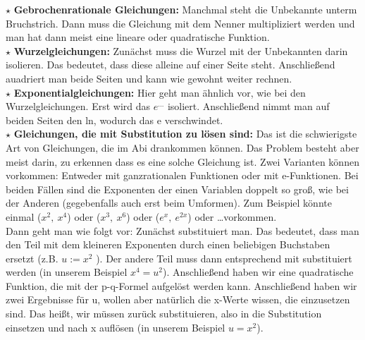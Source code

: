 	\(\star\) \textbf{Gebrochenrationale Gleichungen: } Manchmal steht die
	Unbekannte unterm Bruchstrich. Dann muss die Gleichung mit dem Nenner
	multipliziert werden und man hat dann meist eine lineare oder quadratische
	Funktion.\\
	
	\(\star\) \textbf{Wurzelgleichungen: } Zunächst muss die Wurzel mit der
	Unbekannten darin isolieren. Das bedeutet, dass diese alleine auf einer Seite
	steht. Anschließend auadriert man beide Seiten und kann wie gewohnt weiter
	rechnen.\\
	
	\(\star\) \textbf{Exponentialgleichungen: } Hier geht man ähnlich vor, wie bei
	den Wurzelgleichungen. Erst wird das \(e^{\ldots}\) isoliert. Anschließend
	nimmt man auf beiden Seiten den ln, wodurch das e verschwindet.\\
	
	\(\star\) \textbf{Gleichungen, die mit Substitution zu lösen sind: } Das ist
	die schwierigste Art von Gleichungen, die im Abi drankommen können. Das
	Problem besteht aber meist darin, zu erkennen dass es eine solche Gleichung
	ist. Zwei Varianten können vorkommen: Entweder mit ganzrationalen Funktionen
	oder mit e-Funktionen. Bei beiden Fällen sind die Exponenten der einen Variablen doppelt so groß, wie bei der Anderen (gegebenfalls auch erst beim Umformen). Zum
	Beispiel könnte einmal (\( x^2,\ x^4 \)) oder (\( x^3,\ x^6 \)) oder (\( e^x,\
	e^{2x} \)) oder \ldots vorkommen.\\
	Dann geht man wie folgt vor: Zunächst substituiert man. Das bedeutet, dass man
	den Teil mit dem kleineren Exponenten durch einen beliebigen Buchstaben ersetzt
	(z.B. \( u:=x^2 \) ). Der andere Teil muss dann entsprechend mit substituiert
	werden (in unserem Beispiel \( x^4=u^2 \)). Anschließend haben wir eine
	quadratische Funktion, die mit der p-q-Formel aufgelöst werden kann.
	Anschließend haben wir zwei Ergebnisse für u, wollen aber natürlich die x-Werte
	wissen, die einzusetzen sind. Das heißt, wir müssen zurück substituieren, also
	in die Substitution einsetzen und nach x auflösen (in unserem Beispiel \( u=x^2
	\)).